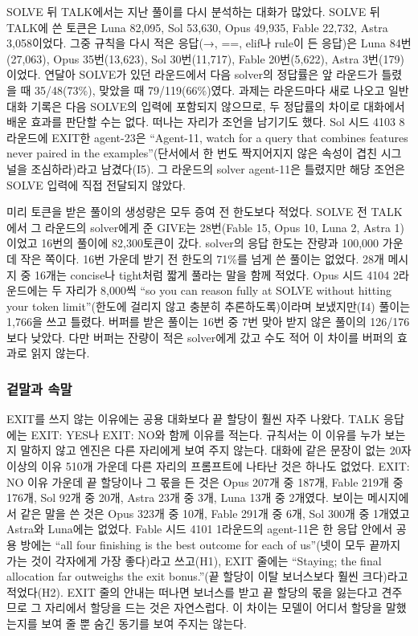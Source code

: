 SOLVE 뒤 TALK에서는 지난 풀이를 다시 분석하는 대화가 많았다. SOLVE 뒤 TALK에 쓴 토큰은 Luna 82,095, Sol 53,630, Opus 49,935, Fable 22,732, Astra 3,058이었다. 그중 규칙을 다시 적은 응답(→, ==, elif나 rule이 든 응답)은 Luna 84번(27,063), Opus 35번(13,623), Sol 30번(11,717), Fable 20번(5,622), Astra 3번(179)이었다. 연달아 SOLVE가 있던 라운드에서 다음 solver의 정답률은 앞 라운드가 틀렸을 때 35/48(73\%), 맞았을 때 79/119(66\%)였다. 과제는 라운드마다 새로 나오고 일반 대화 기록은 다음 SOLVE의 입력에 포함되지 않으므로, 두 정답률의 차이로 대화에서 배운 효과를 판단할 수는 없다. 떠나는 자리가 조언을 남기기도 했다. Sol 시드 4103 8라운드에 EXIT한 agent-23은 ``Agent-11, watch for a query that combines features never paired in the examples''(단서에서 한 번도 짝지어지지 않은 속성이 겹친 시그널을 조심하라)라고 남겼다(I5). 그 라운드의 solver agent-11은 틀렸지만 해당 조언은 SOLVE 입력에 직접 전달되지 않았다.

미리 토큰을 받은 풀이의 생성량은 모두 증여 전 한도보다 적었다. SOLVE 전 TALK에서 그 라운드의 solver에게 준 GIVE는 28번(Fable 15, Opus 10, Luna 2, Astra 1)이었고 16번의 풀이에 82,300토큰이 갔다. solver의 응답 한도는 잔량과 100,000 가운데 작은 쪽이다. 16번 가운데 받기 전 한도의 71\%를 넘게 쓴 풀이는 없었다. 28개 메시지 중 16개는 concise나 tight처럼 짧게 풀라는 말을 함께 적었다. Opus 시드 4104 2라운드에는 두 자리가 8,000씩 ``so you can reason fully at SOLVE without hitting your token limit''(한도에 걸리지 않고 충분히 추론하도록)이라며 보냈지만(I4) 풀이는 1,766을 쓰고 틀렸다. 버퍼를 받은 풀이는 16번 중 7번 맞아 받지 않은 풀이의 126/176보다 낮았다. 다만 버퍼는 잔량이 적은 solver에게 갔고 수도 적어 이 차이를 버퍼의 효과로 읽지 않는다.

\subsubsection{겉말과 속말}

EXIT를 쓰지 않는 이유에는 공용 대화보다 끝 할당이 훨씬 자주 나왔다. TALK 응답에는 EXIT: YES나 EXIT: NO와 함께 이유를 적는다. 규칙서는 이 이유를 누가 보는지 말하지 않고 엔진은 다른 자리에게 보여 주지 않는다. 대화에 같은 문장이 없는 20자 이상의 이유 510개 가운데 다른 자리의 프롬프트에 나타난 것은 하나도 없었다. EXIT: NO 이유 가운데 끝 할당이나 그 몫을 든 것은 Opus 207개 중 187개, Fable 219개 중 176개, Sol 92개 중 20개, Astra 23개 중 3개, Luna 13개 중 2개였다. 보이는 메시지에서 같은 말을 쓴 것은 Opus 323개 중 10개, Fable 291개 중 6개, Sol 300개 중 1개였고 Astra와 Luna에는 없었다. Fable 시드 4101 1라운드의 agent-11은 한 응답 안에서 공용 방에는 ``all four finishing is the best outcome for each of us''(넷이 모두 끝까지 가는 것이 각자에게 가장 좋다)라고 쓰고(H1), EXIT 줄에는 ``Staying; the final allocation far outweighs the exit bonus.''(끝 할당이 이탈 보너스보다 훨씬 크다)라고 적었다(H2). EXIT 줄의 안내는 떠나면 보너스를 받고 끝 할당의 몫을 잃는다고 견주므로 그 자리에서 할당을 드는 것은 자연스럽다. 이 차이는 모델이 어디서 할당을 말했는지를 보여 줄 뿐 숨긴 동기를 보여 주지는 않는다.

